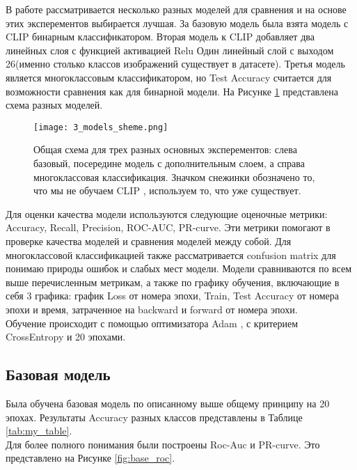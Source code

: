 \documentclass{article}
\begin{document}
В работе рассматривается несколько разных моделей для сравнения и на основе этих эксперементов выбирается лучшая. За базовую модель была взята модель с CLIP \cite{CLIP} бинарным классификатором. Вторая модель к CLIP \cite{CLIP} добавляет два линейных слоя с функцией активацией Relu Один линейный слой с выходом 26(именно столько классов изображений существует в датасете). Третья модель является многоклассовым классификатором, но Test Accuracy считается для возможности сравнения как для бинарной модели. На Рисунке \ref{fig:models_scheme} представлена схема разных моделей.\\

\begin{figure}[ht]
    \centering
    \texttt{[image: 3\_models\_sheme.png]}
    \caption{Общая схема для трех разных основных эксперементов: слева базовый, посередине модель с дополнительным слоем, а справа многоклассовая классификация. Значком снежинки обозначено то, что мы не обучаем CLIP \cite{CLIP}, используем то, что уже существует.}
    \label{fig:models_scheme}
\end{figure}




Для оценки качества модели используются следующие оценочные метрики: Accuracy, Recall, Precision, ROC-AUC, PR-curve. Эти метрики помогают в проверке качества моделей и сравнения моделей между собой. Для многоклассовой классификацией также рассматривается confusion matrix для понимаю природы ошибок и слабых мест модели. Модели сравниваются по всем выше перечисленным метрикам, а также по графику обучения, включающие в себя 3 графика: график Loss от номера эпохи, Train, Test Accuracy от номера эпохи и время, затраченное на backward и forward от номера эпохи.\\

Обучение происходит с помощью оптимизатора Adam \cite{Adam}, с критерием CrossEntropy и 20 эпохами. 



\subsection{Базовая модель}
Была обучена базовая модель по описанному выше общему принципу на 20 эпохах. Результаты Accuracy разных классов представлены в Таблице \ref{tab:my_table}.\\

Для более полного понимания были построены Roc-Auc и PR-curve. Это представлено на Рисунке \ref{fig:base_roc}.\\
\end{document}
